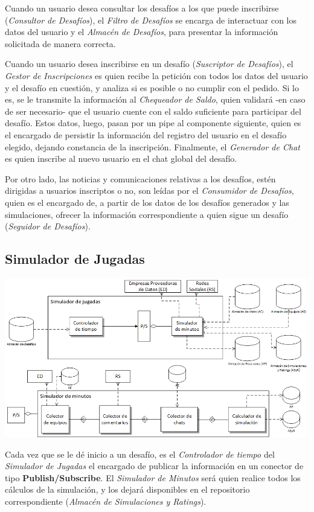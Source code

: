 Cuando un usuario desea consultar los desafíos a los que puede inscribirse (\emph{Consultor de Desafíos}), el \emph{Filtro de Desafíos} se encarga de interactuar con los datos del usuario y el \emph{Almacén de Desafíos}, para presentar la información solicitada de manera correcta.

Cuando un usuario desea inscribirse en un desafío (\emph{Suscriptor de Desafíos}), el \emph{Gestor de Inscripciones} es quien recibe la petición con todos los datos del usuario y el desafío en cuestión, y analiza si es posible o no cumplir con el pedido. Si lo es, se le transmite la información al \emph{Chequeador de Saldo}, quien validará -en caso de ser necesario- que el usuario cuente con el saldo suficiente para participar del desafío. 
Estos datos, luego, pasan por un pipe al componente siguiente, quien es el encargado de persistir la información del registro del usuario en el desafío elegido, dejando constancia de la inscripción.
Finalmente, el \emph{Generador de Chat} es quien inscribe al nuevo usuario en el chat global del desafío.

Por otro lado, las noticias y comunicaciones relativas a los desafíos, estén dirigidas a usuarios inscriptos o no, son leídas por el \emph{Consumidor de Desafíos}, quien es el encargado de, a partir de los datos de los desafíos generados y las simulaciones, ofrecer la información correspondiente a quien sigue un desafío (\emph{Seguidor de Desafíos}).


\newpage
\subsection{Simulador de Jugadas}
\begin{center}
\includegraphics[scale=0.90,angle=90]{diagramas/simulador_de_jugadas}
\label{fig:simulador_de_jugadas}
\end{center}
\newpage
Cada vez que se le dé inicio a un desafío, es el \emph{Controlador de tiempo} del \emph{Simulador de Jugadas} el encargado de publicar la información en un conector de tipo \textbf{Publish/Subscribe}. El \emph{Simulador de Minutos} será quien realice todos los cálculos de la simulación, y los dejará disponibles en el repositorio correspondiente (\emph{Almacén de Simulaciones y Ratings}).

